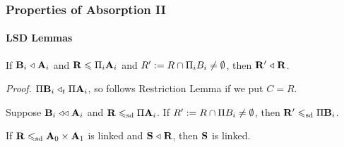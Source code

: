 \documentclass[9pt,xcolor=dvipsnames%
   ]{beamer}
\begin{document}
\begin{frame} \frametitle{Properties of Absorption II}
  \framesubtitle{LSD Lemmas}
    
\begin{lemma}[LSD 1]
\label{lem:gen-abs1}
If $\mathbf{B}_i\mathrel{\triangleleft} \mathbf{A}_i$ and $\mathbf{R} \leqslant \Pi_{i}\mathbf{A}_i$ and $R':= R \cap \Pi_i B_i \neq \emptyset$,
then %
$\mathbf{R}'\mathrel{\triangleleft} \mathbf{R}$.
\end{lemma}
{\it Proof.}  $\Pi \mathbf{B}_i \mathrel{\triangleleft}_t \Pi \mathbf{A}_i$, 
{\small  so follows Restriction Lemma if we put} $C = R$.

  \begin{lemma}[LSD 2]
    \label{lem:sdp-general}
    Suppose $\mathbf{B}_i \mathrel{\triangleleft\triangleleft} \mathbf{A}_i$ and  $\mathbf{R} \leqslant_{\mathrm{sd}} \Pi \mathbf{A}_i$.
    If $R' := R \cap \Pi B_i \neq \emptyset$, then  
    $\mathbf{R}' \leqslant_{\mathrm{sd}} \Pi \mathbf{B}_i$.
  \end{lemma}

  \begin{lemma}[LSD 2]
    \label{lem:linked-absorber}
    If $\mathbf{R} \leqslant_{\mathrm{sd}} \mathbf{A}_0 \times \mathbf{A}_1$ is linked and 
    $\mathbf{S} \mathrel{\triangleleft} \mathbf{R}$, then $\mathbf{S}$ is linked.
  \end{lemma}

  
\end{frame}
\end{document}
